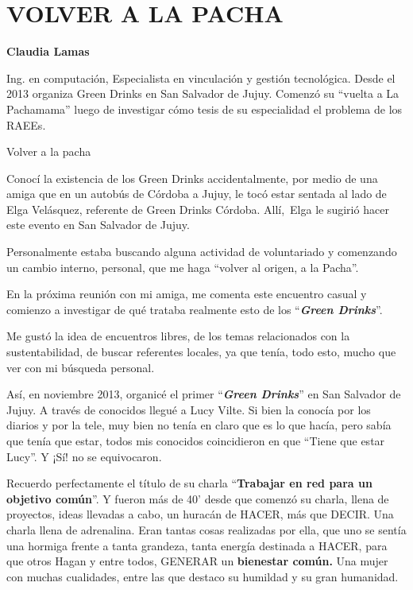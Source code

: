 \hypertarget{VOLVER A LA PACHA}{\chapter{VOLVER A LA PACHA}\label{VOLVER A LA PACHA}}


\textbf{Claudia Lamas}

Ing. en computación, Especialista en vinculación y gestión tecnológica.
Desde el 2013 organiza Green Drinks en San Salvador de Jujuy. Comenzó su
``vuelta a La Pachamama'' luego de investigar cómo tesis de su
especialidad el problema de los RAEEs.

Volver a la pacha

Conocí la existencia de los Green Drinks accidentalmente, por medio de
una amiga que en un autobús de Córdoba a Jujuy, le tocó estar sentada al
lado de Elga Velásquez, referente de Green Drinks Córdoba. Allí,~Elga le
sugirió hacer este evento en San Salvador de Jujuy.

Personalmente estaba buscando alguna actividad de voluntariado y
comenzando un cambio interno, personal, que me haga ``volver al origen,
a la Pacha''.

En la próxima reunión con mi amiga, me comenta este encuentro casual y
comienzo a investigar de qué trataba realmente esto de los
``\textbf{\emph{Green Drinks}}''.

Me gustó la idea de encuentros libres, de los temas relacionados con la
sustentabilidad, de buscar referentes locales, ya que tenía, todo esto,
mucho que ver con mi búsqueda personal.

Así, en noviembre 2013, organicé el primer ``\textbf{\emph{Green
Drinks}}'' en San Salvador de Jujuy. A través de conocidos llegué a Lucy
Vilte. Si bien la conocía por los diarios y por la tele, muy bien no
tenía en claro que es lo que hacía, pero sabía que tenía que estar,
todos mis conocidos coincidieron en que ``Tiene que estar Lucy''. Y ¡Sí!
no se equivocaron.

Recuerdo perfectamente el título de su charla ``\textbf{Trabajar en red
para un objetivo común}''. Y fueron más de 40' desde que comenzó su
charla, llena de proyectos, ideas llevadas a cabo, un huracán de HACER,
más que DECIR. Una charla llena de adrenalina. Eran tantas cosas
realizadas por ella, que uno se sentía una hormiga frente a tanta
grandeza, tanta energía destinada a HACER, para que otros Hagan y entre
todos, GENERAR un \textbf{bienestar común.} Una mujer con muchas
cualidades, entre las que destaco su humildad y su gran humanidad.

